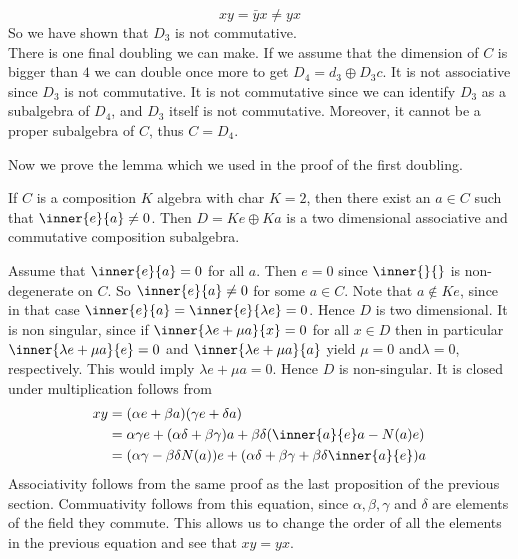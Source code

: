 \documentclass[../Thesis.tex]{subfiles}
\begin{document}
\begin{myproof}
\begin{equation}
xy = \bar{y}x \neq yx
\end{equation}
So we have shown that $D_3$ is not commutative.
\\There is one final doubling we can make. If we assume that the dimension of $C$ is bigger than $4$ we can double once more to get $D_4 = d_3 \oplus D_3c$. It is not associative since $D_3$ is not commutative. It is not commutative since we can identify $D_3$ as a subalgebra of $D_4$, and $D_3$ itself is not commutative. Moreover, it cannot be a proper subalgebra of $C$, thus $C = D_4$.
\end{myproof}
Now we prove the lemma which we used in the proof of the first doubling.
\begin{lemma}
If $C$ is a composition $K$ algebra with char $K = 2$, then there exist an $a \in C$ such that $\inner{e}{a} \neq 0$. Then $D = Ke \oplus Ka$ is a two dimensional associative and commutative composition subalgebra.
\end{lemma}
\begin{myproof}
Assume that $\inner{e}{a} = 0$ for all $a$. Then $ e = 0$ since $\inner{}{}$ is non-degenerate on $C$. So $\inner{e}{a} \neq 0$ for some $a \in C$. Note that $ a \not \in Ke$, since in that case $\inner{e}{a} = \inner{e}{\lambda e} = 0$. Hence $D$ is two dimensional. It is non singular, since if $\inner{\lambda e + \mu a}{x} = 0$ for all $x \in D$ then in particular $\inner{\lambda e + \mu a}{e} = 0$ and $\inner{\lambda e + \mu a}{a}$ yield $\mu = 0$ and$\lambda = 0$, respectively. This would imply $\lambda e + \mu a = 0$. Hence $D$ is non-singular. It is closed under multiplication follows from
\begin{align*}
xy &= (\alpha e + \beta a)(\gamma e + \delta a)\\
&= \alpha \gamma e + (\alpha \delta + \beta \gamma) a + \beta \delta ( \inner{a}{e}a - N(a)e) \\
&= (\alpha \gamma - \beta \delta N(a))e + (\alpha \delta + \beta \gamma + \beta \delta \inner{a}{e})a
\end{align*}
Associativity follows from the same proof as the last proposition of the previous section. Commuativity follows from this equation, since $\alpha, \beta, \gamma$ and $\delta$ are elements of the field they commute. This allows us to change the order of all the elements in the previous equation and see that $xy = yx$.
\end{myproof}
\end{document}
